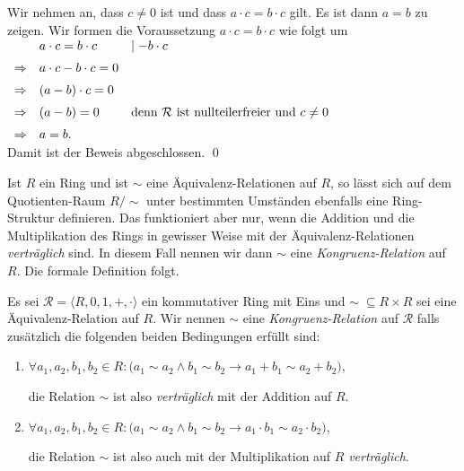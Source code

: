 \proof
Wir nehmen an, dass $c \not = 0$ ist und dass $a \cdot c = b \cdot c$ gilt.  Es ist dann $a = b$ zu zeigen. 
Wir formen die Voraussetzung  $a \cdot c = b \cdot c$ wie folgt um
\\[0.2cm]
\hspace*{1.3cm}
$
\begin{array}[t]{cll}
            & a \cdot c = b \cdot c      & \mid - b \cdot c \\[0.2cm]
\Rightarrow & a \cdot c - b \cdot c  = 0                    \\[0.2cm]
\Rightarrow & (a - b) \cdot c = 0                           \\[0.2cm]
\Rightarrow & (a - b) = 0 & \mbox{denn $\mathcal{R}$ ist nullteilerfreier und $c \not= 0$} \\[0.2cm]
\Rightarrow & a = b.
\end{array}
$
\\[0.2cm]
Damit ist der Beweis abgeschlossen. \qed
\vspace*{0.2cm}

Ist $R$ ein Ring und ist $\sim$ eine \"{A}quivalenz-Relationen auf $R$,
so l\"{a}sst sich auf dem Quotienten-Raum $R/\!\sim$ unter bestimmten Umst\"{a}nden ebenfalls eine Ring-Struktur
definieren.   Das funktioniert aber nur, wenn die Addition und die Multiplikation des Rings in gewisser
Weise mit der \"{A}quivalenz-Relationen \emph{vertr\"{a}glich} sind.  In diesem Fall nennen wir dann $\sim$ eine
\emph{Kongruenz-Relation} auf $R$.  Die formale Definition folgt.

\begin{Definition}
Es sei $\mathcal{R} = \langle R, 0, 1, +, \cdot \rangle$ ein kommutativer Ring mit Eins und $\sim\; \subseteq R \times R$ sei eine
\"{A}quivalenz-Relation auf $R$.   Wir nennen $\sim$ eine {\color{blue}\emph{Kongruenz-Relation}} auf $\mathcal{R}$ 
falls zus\"{a}tzlich die folgenden beiden Bedingungen erf\"{u}llt sind:
\begin{enumerate}
\item $\forall a_1, a_2, b_1, b_2 \in R: 
       \bigl(a_1 \sim a_2 \wedge b_1 \sim b_2 \rightarrow a_1 + b_1 \sim a_2 + b_2\bigr)
      $,

      die Relation $\sim$ ist also \emph{vertr\"{a}glich} mit der Addition auf $R$.
\item $\forall a_1, a_2, b_1, b_2 \in R: 
       \bigl(a_1 \sim a_2 \wedge b_1 \sim b_2 \rightarrow a_1 \cdot b_1 \sim a_2 \cdot b_2\bigr)
      $,

      die Relation $\sim$ ist also auch mit der Multiplikation auf $R$ \emph{vertr\"{a}glich}.
      \eox
\end{enumerate}
\end{Definition}
  
